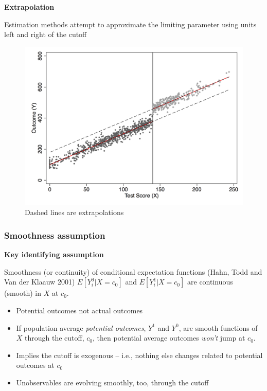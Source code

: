 \documentclass[notes=show]{beamer}
\begin{document}
\begin{frame}[plain]
\begin{center}
\textbf{Extrapolation}
\end{center}
Estimation methods attempt to approximate the limiting parameter using units left and right of the cutoff
	\begin{figure}
	\includegraphics[scale=0.2]{./lecture_includes/sim_extrapolation.png}
	\caption{Dashed lines are extrapolations}
	\end{figure}
\end{frame}




\subsubsection{Smoothness assumption}

\begin{frame}[plain]
	\begin{center}
	\textbf{Key identifying assumption}
	\end{center}
	
	\begin{block}{Smoothness (or continuity) of conditional expectation functions (Hahn, Todd and Van der Klaauw 2001)}
	$E[Y_i^0 | X=c_0]$ and $E[Y_i^1 | X=c_0]$ are continuous (smooth) in $X$ at $c_0$. 
	\end{block}
	
	\begin{itemize}
	\item Potential outcomes not actual outcomes
	\item If population average \emph{potential outcomes}, $Y^1$ and $Y^0$, are smooth functions of $X$ through the cutoff, $c_0$, then potential average outcomes \emph{won't} jump at $c_0$. 
	\item Implies the cutoff is exogenous -- i.e., nothing else changes related to potential outcomes at $c_0$
	\item Unobservables are evolving smoothly, too, through the cutoff
	\end{itemize}
	
\end{frame}
\end{document}
